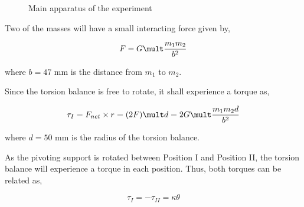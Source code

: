 \documentclass[twoside,twocolumn]{article}
\begin{document}
\begin{figure}[H]
\centering
  \begin{center}
  \end{center}
  \caption{Main apparatus of the experiment}
\end{figure}
\label{fig:apparatus}

Two of the masses will have a small interacting force given by,

\begin{equation}
\label{eq:attraction}
F = G \mult \frac{m_{1}m_{2}}{b^2}
\end{equation}

where $b = 47$ mm is the distance from $m_{1}$ to $m_{2}$.

Since the torsion balance is free to rotate, it shall experience a torque as,

\begin{equation}
\label{eq:torque}
\tau_{I} = F_{net} \times r = (2F) \mult d = 2G \mult \frac{m_{1}m_{2}d}{b^2}
\end{equation}

where $d = 50$ mm is the radius of the torsion balance.

As the pivoting support is rotated between Position I and Position II, the torsion balance will experience
a torque in each position. Thus, both torques can be related as,

\begin{equation}
\label{eq:pos_torque}
\tau_{I} = -\tau_{II} = \kappa \theta
\end{equation}
\end{document}
